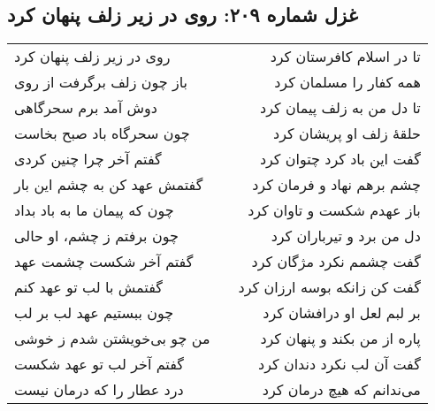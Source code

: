 \begin{center}
\section*{غزل شماره ۲۰۹: روی در زیر زلف پنهان کرد}
\label{sec:209}
\begin{longtable}{l p{0.5cm} r}
روی در زیر زلف پنهان کرد
&&
تا در اسلام کافرستان کرد
\\
باز چون زلف برگرفت از روی
&&
همه کفار را مسلمان کرد
\\
دوش آمد برم سحرگاهی
&&
تا دل من به زلف پیمان کرد
\\
چون سحرگاه باد صبح بخاست
&&
حلقهٔ زلف او پریشان کرد
\\
گفتم آخر چرا چنین کردی
&&
گفت این باد کرد چتوان کرد
\\
گفتمش عهد کن به چشم این بار
&&
چشم برهم نهاد و فرمان کرد
\\
چون که پیمان ما به باد بداد
&&
باز عهدم شکست و تاوان کرد
\\
چون برفتم ز چشم، او حالی
&&
دل من برد و تیرباران کرد
\\
گفتم آخر شکست چشمت عهد
&&
گفت چشمم نکرد مژگان کرد
\\
گفتمش با لب تو عهد کنم
&&
گفت کن زانکه بوسه ارزان کرد
\\
چون ببستیم عهد لب بر لب
&&
بر لبم لعل او درافشان کرد
\\
من چو بی‌خویشتن شدم ز خوشی
&&
پاره از من بکند و پنهان کرد
\\
گفتم آخر لب تو عهد شکست
&&
گفت آن لب نکرد دندان کرد
\\
درد عطار را که درمان نیست
&&
می‌ندانم که هیچ درمان کرد
\\
\end{longtable}
\end{center}

